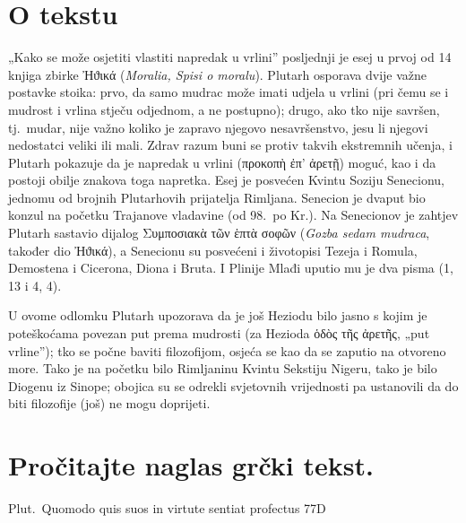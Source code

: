 
\section*{O tekstu}

„Kako se može osjetiti vlastiti napredak u vrlini'' posljednji je esej u prvoj od 14 knjiga zbirke \textgreek[variant=ancient]{Ἠϑικά} (\textit{Moralia, Spisi o moralu}). Plutarh osporava dvije važne postavke stoika: prvo, da samo mudrac može imati udjela u vrlini (pri čemu se i mudrost i vrlina stječu odjednom, a ne postupno); drugo, ako tko nije savršen, tj.\ mudar, nije važno koliko je zapravo njegovo nesavršenstvo, jesu li njegovi nedostatci veliki ili mali. Zdrav razum buni se protiv takvih ekstremnih učenja, i Plutarh pokazuje da je napredak u vrlini \textgreek[variant=ancient]{(προκοπὴ ἐπ' ἀρετῇ)} moguć, kao i da postoji obilje znakova toga napretka. Esej je posvećen Kvintu Soziju Senecionu, jednomu od brojnih Plutarhovih prijatelja Rimljana. Senecion je dvaput bio konzul na početku Trajanove vladavine (od 98.\ po Kr.). Na Senecionov je zahtjev Plutarh sastavio dijalog \textgreek[variant=ancient]{Συμποσιακὰ τῶν ἑπτὰ σοφῶν} (\textit{Gozba sedam mudraca}, također dio \textgreek[variant=ancient]{Ἠϑικά}), a Senecionu su posvećeni i životopisi Tezeja i Romula, Demostena i Cicerona, Diona i Bruta. I Plinije Mlađi uputio mu je dva pisma (1, 13 i 4, 4).

U ovome odlomku Plutarh upozorava da je još Heziodu bilo jasno s kojim je poteškoćama povezan put prema mudrosti (za Hezioda ὁδὸς τῆς ἀρετῆς, „put vrline''); tko se počne baviti filozofijom, osjeća se kao da se zaputio na otvoreno more. Tako je na početku bilo Rimljaninu Kvintu Sekstiju Nigeru, tako je bilo Diogenu iz Sinope; obojica su se odrekli svjetovnih vrijednosti pa ustanovili da do biti filozofije (još) ne mogu doprijeti.


\section*{Pročitajte naglas grčki tekst.}

Plut.\ Quomodo quis suos in virtute sentiat profectus 77D


\medskip


